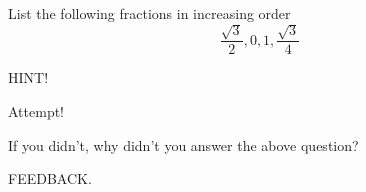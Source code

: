 \documentclass{ximera}
\begin{document}
\begin{problem} 
\begin{problem}
    List the following fractions in increasing order
    $$\frac{\sqrt{3}}{2}, 0, 1, \frac{\sqrt{3}}{4}$$
    
    \begin{hint}
    HINT!
    \end{hint}
    
    
  \begin{multipleChoice}
       
  \begin{feedback}[attempt]
  Attempt!
  \end{feedback}
  
  \end{multipleChoice}
  
\end{problem}
\begin{question}
  

  If you didn't, why didn't you answer the above question?
  
  \begin{multipleChoice}
      
      \begin{feedback}[attempt]
      FEEDBACK.
      \end{feedback}
      
  \end{multipleChoice}
  
\end{question}
\end{problem}

\end{document}

